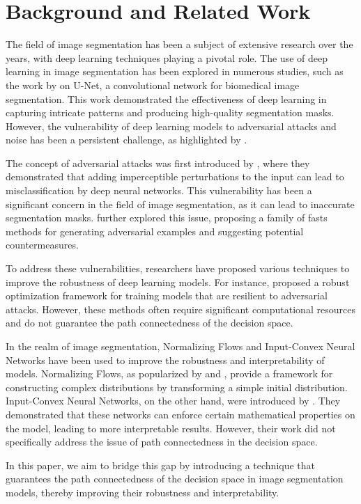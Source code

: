 \section{Background and Related Work}

The field of image segmentation has been a subject of extensive research over the years,
with deep learning techniques playing a pivotal role.
The use of deep learning in image segmentation has been explored in numerous studies, such as the work by \citet{ronneberger2015u} on U-Net,
a convolutional network for biomedical image segmentation.
This work demonstrated the effectiveness of deep learning in capturing intricate patterns and producing high-quality segmentation masks.
However, the vulnerability of deep learning models to adversarial attacks and noise has been a persistent challenge,
as highlighted by \citet{szegedy2013intriguing}.

The concept of adversarial attacks was first introduced by \citet{szegedy2013intriguing}, where they demonstrated that adding imperceptible perturbations
to the input can lead to misclassification by deep neural networks.
This vulnerability has been a significant concern in the field of image segmentation, as it can lead to inaccurate segmentation masks.
\citet{goodfellow2014explaining} further explored this issue, proposing a family of fasts methods for generating adversarial examples
and suggesting potential countermeasures.

To address these vulnerabilities, researchers have proposed various techniques to improve the robustness of deep learning models.
For instance, \citet{madry2017towards} proposed a robust optimization framework for training models that are resilient to adversarial attacks.
However, these methods often require significant computational resources and do not guarantee the path connectedness of the decision space.

In the realm of image segmentation, Normalizing Flows and Input-Convex Neural Networks have been used to improve the robustness and
interpretability of models. Normalizing Flows, as popularized by \citet{rezende2015variational} and \citet{dinh2016density},
provide a framework for constructing complex distributions by transforming a simple initial distribution. Input-Convex Neural Networks, on the other hand, were introduced by \citet{amos2017input}.
They demonstrated that these networks can enforce certain mathematical properties on the model, leading to more interpretable results.
However, their work did not specifically address the issue of path connectedness in the decision space.

In this paper, we aim to bridge this gap by introducing a technique that guarantees the path connectedness of the decision space in image segmentation
models, thereby improving their robustness and interpretability.